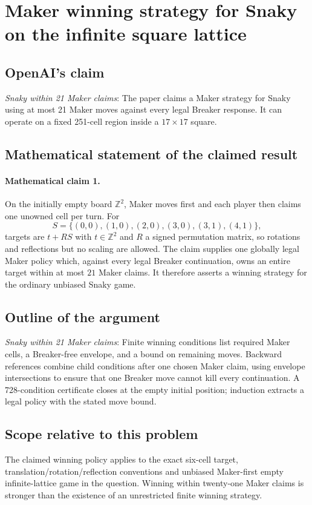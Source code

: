 \documentclass[11pt]{article}
\begin{document}
\section*{Maker winning strategy for Snaky on the infinite square lattice}

\subsection{OpenAI's claim}
\textit{Snaky within 21 Maker claims}: The paper claims a Maker strategy for Snaky using at most 21 Maker moves against every legal Breaker response. It can operate on a fixed 251-cell region inside a $17\times17$ square.

\subsection{Mathematical statement of the claimed result}
\paragraph{Mathematical claim 1.} On the initially empty board $\mathbb Z^2$, Maker moves first and each player then claims one unowned cell per turn. For \[S=\{(0,0),(1,0),(2,0),(3,0),(3,1),(4,1)\},\] targets are $t+RS$ with $t\in\mathbb Z^2$ and $R$ a signed permutation matrix, so rotations and reflections but no scaling are allowed. The claim supplies one globally legal Maker policy which, against every legal Breaker continuation, owns an entire target within at most $21$ Maker claims. It therefore asserts a winning strategy for the ordinary unbiased Snaky game.

\subsection{Outline of the argument}
\textit{Snaky within 21 Maker claims}: Finite winning conditions list required Maker cells, a Breaker-free envelope, and a bound on remaining moves. Backward references combine child conditions after one chosen Maker claim, using envelope intersections to ensure that one Breaker move cannot kill every continuation. A 728-condition certificate closes at the empty initial position; induction extracts a legal policy with the stated move bound.

\subsection{Scope relative to this problem}
The claimed winning policy applies to the exact six-cell target, translation/rotation/reflection conventions and unbiased Maker-first empty infinite-lattice game in the question. Winning within twenty-one Maker claims is stronger than the existence of an unrestricted finite winning strategy.
\end{document}
